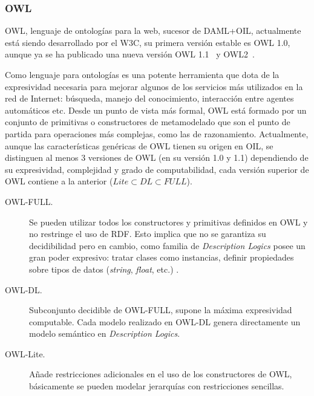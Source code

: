 \subsubsection{OWL}\label{owl}
\gls{OWL}, lenguaje de ontologías para la web, sucesor de DAML+OIL, actualmente está
siendo desarrollado por el W3C, su primera versión estable es OWL 1.0, 
aunque ya se ha publicado una nueva versión OWL 1.1~\cite{OWL11} y OWL2~\cite{owl2-primer}.

Como lenguaje para ontologías es una potente herramienta que dota de la
expresividad necesaria para mejorar algunos de los servicios más utilizados en
la red de Internet: búsqueda, manejo del conocimiento, interacción entre agentes
automáticos etc. Desde un punto de vista más formal, OWL está formado por
un conjunto de primitivas o constructores de metamodelado que son el punto de
partida para operaciones más complejas, como las de razonamiento. Actualmente,
aunque las características genéricas de OWL tienen su origen en OIL, se distinguen
al menos 3 versiones de OWL (en su versión 1.0 y 1.1) dependiendo de su expresividad, complejidad y grado
de computabilidad, cada versión superior de OWL contiene a la anterior
($Lite\subset DL \subset FULL$).

\begin{description}
\item[OWL-FULL.] Se pueden utilizar todos los constructores y primitivas
definidos en OWL y no restringe el uso de RDF. Esto implica que no se garantiza
su decidibilidad pero en cambio, como familia de \textit{Description Logics}
posee un gran poder expresivo: tratar clases como instancias, definir
propiedades sobre tipos de datos (\textit{string}, \textit{float}, etc.) .

\item[OWL-DL.] Subconjunto decidible de OWL-FULL, supone la máxima expresividad
computable. Cada modelo realizado en OWL-DL genera directamente un modelo
semántico en \textit{Description Logics}.

\item[OWL-Lite.] Añade restricciones adicionales en el uso de los
constructores de OWL, básicamente se pueden modelar jerarquías con restricciones
sencillas.
\end{description}

% 


